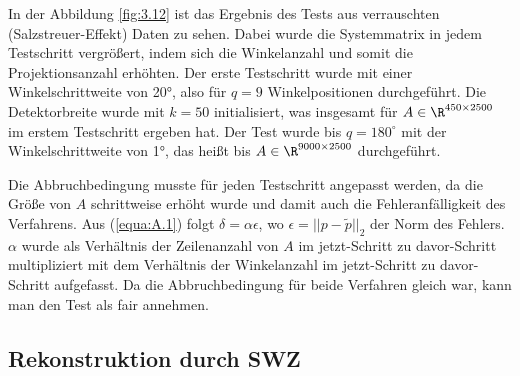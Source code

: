 In der Abbildung \ref{fig:3.12} ist das Ergebnis des Tests aus verrauschten (Salzstreuer-Effekt) Daten zu sehen. Dabei wurde die Systemmatrix in jedem Testschritt vergrößert, indem sich die Winkelanzahl und somit die Projektionsanzahl erhöhten. Der erste Testschritt wurde mit einer Winkelschrittweite von 20°, also für $q = 9$ Winkelpositionen durchgeführt. Die Detektorbreite wurde mit $k = 50$ initialisiert, was insgesamt für $A \in \R^{450\times2500}$ im erstem Testschritt ergeben hat. Der Test wurde bis $q = 180^{\circ}$ mit der Winkelschrittweite von 1°, das heißt bis $A \in \R^{9000 \times 2500}$ durchgeführt.

Die Abbruchbedingung musste für jeden Testschritt angepasst werden, da die Größe von $A$ schrittweise erhöht wurde und damit auch die Fehleranfälligkeit des Verfahrens. Aus (\ref{equa:A.1}) folgt $\delta = \alpha\epsilon$, wo $\epsilon = ||p - \tilde{p}||_2$ der Norm des Fehlers. $\alpha$ wurde als Verhältnis der Zeilenanzahl von $A$ im jetzt-Schritt zu davor-Schritt multipliziert mit dem Verhältnis der Winkelanzahl im jetzt-Schritt zu davor-Schritt aufgefasst. Da die Abbruchbedingung für beide Verfahren gleich war, kann man den Test als fair annehmen.

\subsection{Rekonstruktion durch SWZ}
\label{cha:3.2.2}

